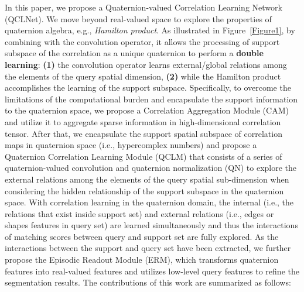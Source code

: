 \documentclass[lettersize,journal]{IEEEtran}
\begin{document}
In this paper, we propose a Quaternion-valued Correlation Learning Network (QCLNet). We move beyond real-valued space to explore the properties of quaternion algebra, e.g., \textit{Hamilton product}. As illustrated in Figure~\ref{Figure1}, by combining with the convolution operator, it allows the processing of support subspace of the correlation as a unique quaternion to perform a \textbf{double learning}: \textbf{(1)} the convolution operator learns external/global relations among the elements of the query spatial dimension, \textbf{(2)} while the Hamilton product accomplishes the learning of the support subspace. Specifically, to overcome the limitations of the computational burden and encapsulate the support information to the quaternion space, we propose a Correlation Aggregation Module (CAM) and utilize it to aggregate sparse information in high-dimensional correlation tensor. After that, we encapsulate the support spatial subspace of correlation maps in quaternion space (i.e., hypercomplex numbers) and propose a Quaternion Correlation Learning Module (QCLM) that consists of a series of quaternion-valued convolution and quaternion normalization (QN) to explore the external relations among the elements of the query spatial sub-dimension when considering the hidden relationship of the support subspace in the quaternion space. With correlation learning in the quaternion domain, the internal (i.e., the relations that exist inside support set) and external relations (i.e., edges or shapes features in query set) are learned simultaneously and thus the interactions of matching scores between query and support set are fully explored. As the interactions between the support and query set have been extracted, we further propose the Episodic Readout Module (ERM), which transforms quaternion features into real-valued features and utilizes low-level query features to refine the segmentation results. The contributions of this work are summarized as follows:
\end{document}
